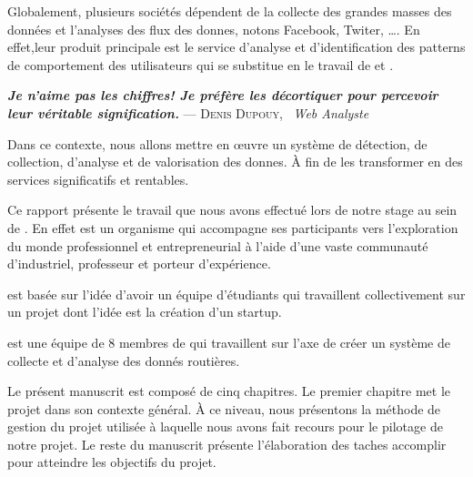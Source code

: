 Globalement, plusieurs sociétés dépendent de la collecte des grandes masses des
données et l'analyses des flux des donnes, notons Facebook, Twiter, \ldots.
En effet,leur produit principale est le service
d'analyse et d'identification des patterns de comportement des utilisateurs
qui se substitue en le travail de  et .

\begin{center}
\textbf{\textit{Je n’aime pas les chiffres! Je préfère les décortiquer pour
percevoir leur véritable signification.}} \linebreak
\hfill --- \textsc{Denis Dupouy}, \ \textit{Web Analyste}
\end{center}

Dans ce contexte, nous allons mettre en \oe{}uvre un système de détection, de
collection, d'analyse et de valorisation des donnes.
À fin de les transformer en
des services significatifs et rentables.

Ce rapport présente le travail que nous avons effectué lors de notre stage au
sein de . En effet  est
un organisme qui accompagne ses participants vers l'exploration du monde
professionnel et entrepreneurial à l'aide d'une vaste communauté d'industriel,
professeur et porteur d'expérience.

 est basée sur l'idée d'avoir un équipe d'étudiants
qui travaillent collectivement sur un projet dont l'idée est la création d'un startup.

 est une équipe de 8 membres  de  qui
travaillent sur l'axe de créer un système de collecte et d'analyse des donnés routières.

Le présent manuscrit est composé de cinq chapitres. Le premier chapitre met le
projet dans son contexte général. À ce niveau, nous présentons la méthode
de gestion du projet utilisée à laquelle nous avons fait recours
pour le pilotage de notre projet. Le reste du manuscrit présente l'élaboration
des taches accomplir pour atteindre les objectifs du projet.